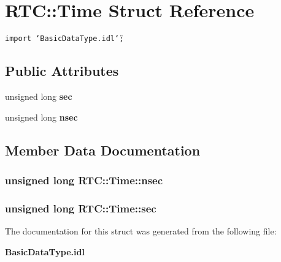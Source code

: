 \section{RTC::Time Struct Reference}
\label{structRTC_1_1Time}
{\tt import \char`\"{}Basic\-Data\-Type.idl\char`\"{};}

\subsection*{Public Attributes}
\begin{CompactItemize}
\item 
unsigned long {\bf sec}
\item 
unsigned long {\bf nsec}
\end{CompactItemize}


\subsection{Member Data Documentation}
\subsubsection{\setlength{\rightskip}{0pt plus 5cm}unsigned long {\bf RTC::Time::nsec}}\label{structRTC_1_1Time_RTC_1_1Timeo1}


\subsubsection{\setlength{\rightskip}{0pt plus 5cm}unsigned long {\bf RTC::Time::sec}}\label{structRTC_1_1Time_RTC_1_1Timeo0}




The documentation for this struct was generated from the following file:\begin{CompactItemize}
\item 
{\bf Basic\-Data\-Type.idl}\end{CompactItemize}
